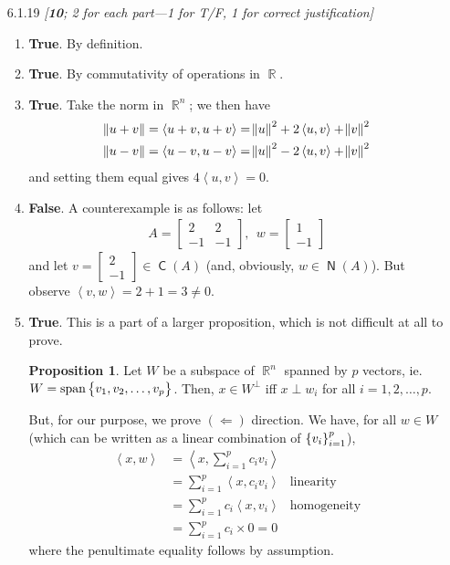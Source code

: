 \documentclass{amsart}
\theoremstyle{definition}
\newtheorem{proposition}[definition]{Proposition}
\theoremstyle{definition}
\DeclareMathOperator{\R}{\mathbb{R}}
\DeclareMathOperator{\1}{\mathbbm{1}}
\DeclareMathOperator{\Span}{span}
\DeclareMathOperator{\col}{\mathsf{C}}
\DeclareMathOperator{\nul}{\mathsf{N}}
\newcommand{\innerproduct}[2]{\left\langle #1,#2 \right\rangle}
\begin{document}
\begin{enumerate}[itemsep = 2mm]
		
		\item[6.1.19] \textit{[\textbf{10}; 2 for each part---1 for T/F, 1 for correct justification]}
		
		\begin{enumerate}
			\item \textbf{True}. By definition.
			
			\item \textbf{True}. By commutativity of operations in $\R$.
			
			\item \textbf{True}. Take the norm in $\R^n$; we then have
			\begin{align*}
			\norm{u+v} &= \innerproduct{u+v}{u+v} = \norm{u}^2 + 2 \innerproduct{u}{v} + \norm{v}^2 \\
			\norm{u-v} &= \innerproduct{u-v}{u-v} = \norm{u}^2 - 2 \innerproduct{u}{v} + \norm{v}^2 
			\end{align*}
			and setting them equal gives $4 \innerproduct{u}{v} = 0$.
			
			\item \textbf{False}. A counterexample is as follows: let
			\begin{align*}
			A = \begin{bmatrix}
			2& 2 \\ -1 & -1
			\end{bmatrix}, \: \: w = \begin{bmatrix}
			1 \\ -1
			\end{bmatrix}
			\end{align*}
			and let $v = \begin{bmatrix}
			2 \\ -1
			\end{bmatrix} \in \col(A)$ (and, obviously, $w \in \nul(A)$). But observe $\innerproduct{v}{w} = 2 + 1 = 3 \neq 0$.
			
			\item \textbf{True}. This is a part of a larger proposition, which is not difficult at all to prove.
			\begin{proposition}
				Let $W$ be a subspace of $\R^n$ spanned by $p$ vectors, ie. $W = \Span \set{v_1,v_2,\dots,v_p}$. Then, $x \in W^\perp$ iff $x \perp w_i$ for all $i=1,2,\dots,p$.
			\end{proposition}
			But, for our purpose, we prove $(\Leftarrow)$ direction. We have, for all $w \in W$ (which can be written as a linear combination of $\set{v_i}_{i=1}^{p}$),
			\begin{align*}
			\innerproduct{x}{w} &= \innerproduct{x}{\sum_{i=1}^{p} c_i v_i} & \\
			&= \sum_{i=1}^{p}  \innerproduct{x}{ c_i v_i} & \text{linearity} \\
			&= \sum_{i=1}^{p} c_i \innerproduct{x}{v_i} & \text{homogeneity} \\
			&= \sum_{i=1}^{p} c_i \times 0 = 0
			\end{align*}
			where the penultimate equality follows by assumption. 
		\end{enumerate}
		

\end{enumerate}
\end{document}
